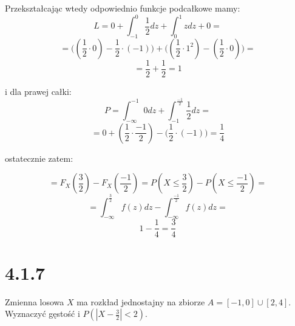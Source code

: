 \documentclass{article}
\begin{document}
Przekształcając wtedy odpowiednio funkcje podcałkowe mamy:
\begin{equation*}
    L = 0 + \int_{-1}^{0} \frac{1}{2} dz + \int_{0}^{1} z dz + 0 =
\end{equation*}
\begin{equation*}
    = \big((\frac{1}{2} \cdot 0) - \frac{1}{2} \cdot (-1)\big) + \big((\frac{1}{2} \cdot 1^{2}) - (\frac{1}{2} \cdot 0)\big) =
\end{equation*}
\begin{equation*}
    = \frac{1}{2} + \frac{1}{2} = 1
\end{equation*}

i dla prawej całki:
\begin{equation*}
    P = \int_{- \infty}^{-1} 0 dz + \int_{- 1}^{\frac{-1}{2}} \frac{1}{2} dz =
\end{equation*}
\begin{equation*}
    = 0 + (\frac{1}{2} \cdot \frac{-1}{2}) - \big(\frac{1}{2} \cdot (-1)\big) = \frac{1}{4}
\end{equation*}

ostatecznie zatem:

\begin{equation*}
    = F_{X}(\frac{3}{2}) - F_{X}(\frac{-1}{2}) = P(X \leq \frac{3}{2}) - P(X \leq \frac{-1}{2}) =
\end{equation*}
\begin{equation*}
    = \int_{- \infty}^{\frac{3}{2}} f(z) dz - \int_{- \infty}^{\frac{-1}{2}} f(z) dz =
\end{equation*}
\begin{equation*}
    1 - \frac{1}{4} = \frac{3}{4}
\end{equation*}



\section*{4.1.7}
\begin{center}
    Zmienna losowa \(X\) ma rozkład jednostajny na zbiorze \(A = [-1, 0] \cup [2, 4]\). Wyznaczyć gęstość i \(P(|X - \frac{3}{2}| < 2)\).
\end{center}
\end{document}
